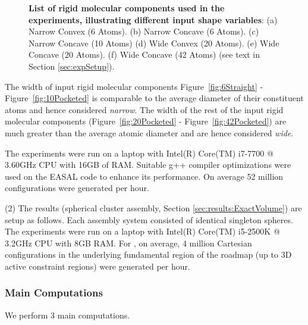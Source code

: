 \documentclass[]{article}
\newcommand{\figref}[1]{Figure~\ref{#1}}
\newcommand{\rmc}{rigid molecular component}
\newcommand{\rahul}[1]{\color{black}{#1}\color{black}}
\begin{document}
\begin{figure}[htpb] \centering
{}
\caption{\scriptsize \textbf{List of \rmc s used in the experiments, illustrating different input 
shape variables}: (a) Narrow Convex (6 Atoms). (b) Narrow Concave (6
Atoms). (c) Narrow Concave (10 Atoms) (d) Wide Convex (20 Atoms). (e) Wide
		Concave (20 Atoms). (f) Wide Concave (42 Atoms) (see text in Section \ref{sec:expSetup}).}
\label{fig:inputMolecules}
\end{figure}

The width of input \rmc s \figref{fig:6Straight} - \figref{fig:10Pocketed} is
comparable to the average diameter of their constituent atoms and hence
considered \emph{narrow}. The width of the rest of the input \rmc s
(\figref{fig:20Pocketed} - \figref{fig:42Pocketed}) are much greater than the
average atomic diameter and are hence considered \emph{wide}. 

The experiments were run on a laptop with Intel(R) Core(TM) i7-7700 @ 3.60GHz
CPU with 16GB of RAM. Suitable g++ compiler optimizations were used on the
EASAL code \rahul{(open source software available on Bitbucket at
https://bitbucket.org/geoplexity/easal) } to enhance its performance.  On average
52 million configurations were generated per hour.


(2) The results  (spherical cluster assembly, Section
\ref{sec:results:ExactVolume}) are setup as follows. Each assembly system
consisted of  identical singleton spheres. The experiments were run on a
laptop with Intel(R) Core(TM) i5-2500K @ 3.2GHz CPU with 8GB RAM. For ,
on average, 4 million Cartesian configurations in the underlying fundamental
region of the roadmap (up to 3D active constraint regions) were generated per
hour.


\subsubsection{Main Computations}
\label{sec:keyComputations}
We perform 3 main computations. 
\end{document}
